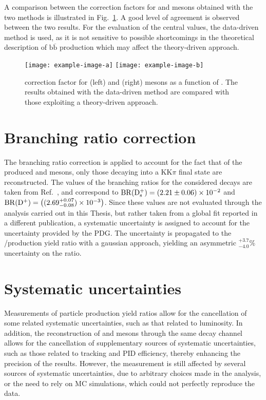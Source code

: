 A comparison between the \fp correction factors for \ds and \dpl mesons obtained with the two methods is illustrated in Fig.~\ref{fig:fp_comparison}. A good level of agreement is observed between the two results. For the evaluation of the central \fp values, the data-driven method is used, as it is not sensitive to possible shortcomings in the theoretical description of $\mathrm{b\overline{b}}$ production which may affect the theory-driven approach.

\begin{figure}
    \begin{center}
    \texttt{[image: example-image-a]}
    \texttt{[image: example-image-b]}
    \caption{\fp correction factor for \ds (left) and \dpl (right) mesons as a function of \pt. The results obtained with the data-driven method are compared with those exploiting a theory-driven approach.} 
    \label{fig:fp_comparison} 
    \end{center}
\end{figure}

\section{Branching ratio correction}
\begin{sloppypar}

The branching ratio correction is applied to account for the fact that of the produced \ds and \dpl mesons, only those decaying into a KK$\pi$ final state are reconstructed. The values of the branching ratios for the considered decays are taken from Ref.~\cite{pdg}, and correspond to \mbox{$\mathrm{BR}(\mathrm{D_s^+}) = (2.21\pm0.06)\times10^{-2}$} and \mbox{$\mathrm{BR}(\mathrm{D^+}) = \left((2.69^{+0.07}_{-0.08})\times10^{-3}\right)$}. Since these values are not evaluated through the analysis carried out in this Thesis, but rather taken from a global fit reported in a different publication, a systematic uncertainty is assigned to account for the uncertainty provided by the PDG. The uncertainty is propagated to the \ds/\dpl production yield ratio with a gaussian approach, yielding an asymmetric $^{+3.7}_{-4.0}\%$ uncertainty on the ratio.
\end{sloppypar}

\section{Systematic uncertainties}
Measurements of particle production yield ratios allow for the cancellation of some related systematic uncertainties, such as that related to luminosity. In addition, the reconstruction of \ds and \dpl mesons through the same decay channel allows for the cancellation of supplementary sources of systematic uncertainties, such as those related to tracking and PID efficiency, thereby enhancing the precision of the results. However, the measurement is still affected by several sources of systematic uncertainties, due to arbitrary choices made in the analysis, or the need to rely on MC simulations, which could not perfectly reproduce the data. 

